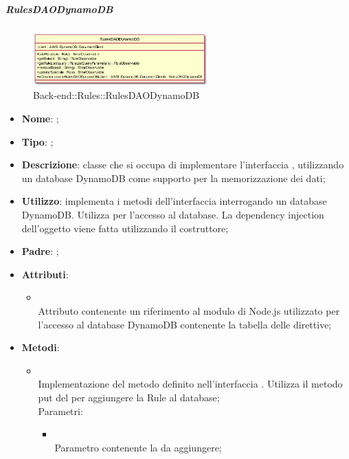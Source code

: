 \hypertarget{RulesDAODynamoDB_label}{\subparagraph{RulesDAODynamoDB}}
\begin{figure}[h]
	\centering
	\includegraphics[width=0.60\textwidth,height=\textheight,keepaspectratio]{images/ClassRulesDAODynamoDB.png}
	\caption{Back-end::Rules::RulesDAODynamoDB}
\end{figure}
\begin{itemize}
	\item \textbf{Nome}: ;
	\item \textbf{Tipo}: ;
	\item \textbf{Descrizione}: classe che si occupa di implementare l'interfaccia , utilizzando un database DynamoDB come supporto per la memorizzazione dei dati;
	\item \textbf{Utilizzo}: implementa i metodi dell'interfaccia  interrogando un database DynamoDB. Utilizza  per l'accesso al database. La dependency injection dell'oggetto  viene fatta utilizzando il costruttore;
	\item \textbf{Padre}: ;
	\item \textbf{Attributi}:
	\begin{itemize}
		\item[]  \\
		Attributo contenente un riferimento al modulo di Node.js utilizzato per l'accesso al database DynamoDB contenente la tabella delle direttive;
	\end{itemize}
	\item \textbf{Metodi}:
	\begin{itemize}
		\item[]  \\		Implementazione del metodo definito nell'interfaccia . Utilizza il metodo put del  per aggiungere la Rule al database;\\
		Parametri:
		\begin{itemize}
			\item {} \\
			Parametro contenente la  da aggiungere;

\end{itemize}
\end{itemize}
\end{itemize}
